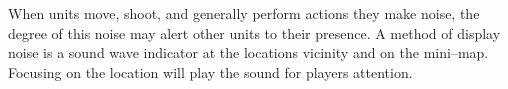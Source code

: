 
When units move, shoot, and generally perform actions they make noise, the degree of this noise may alert other units to their presence. A method of display noise is a sound wave indicator at the locations vicinity and on the mini--map. Focusing on the location will play the sound for players attention.

